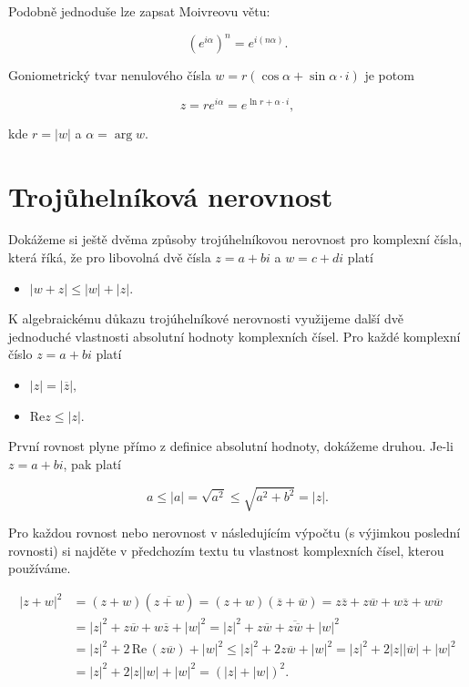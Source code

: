 \documentclass[12pt,a4paper]{report}
\begin{document}
	Podobně jednoduše lze zapsat Moivreovu větu:
	
	\begin{equation}
		(e^{i\alpha})^n = e^{i(n\alpha)}.
	\end{equation}
	
	Goniometrický tvar nenulového čísla $w = r(\cos\alpha + \sin\alpha\cdot i)$ je potom
	
	\begin{equation}
		z = re^{i\alpha} = e^{\ln r + \alpha\cdot i},
	\end{equation}
	
	kde $r = |w|$ a $\alpha = \arg w.$
	
	
	\section{Trojůhelníková nerovnost}
	
	Dokážeme si ještě dvěma způsoby trojúhelníkovou nerovnost pro komplexní čísla, která říká, že pro libovolná dvě čísla $z = a+bi$ a $w = c+di$ platí
	
	\begin{itemize}
		\item $|w+z| \le |w| + |z|.$
	\end{itemize}
	
	K algebraickému důkazu trojúhelníkové nerovnosti využijeme další dvě jednoduché vlastnosti absolutní hodnoty komplexních čísel. Pro každé komplexní číslo $z = a+bi$ platí
	
	\begin{itemize}
		\item $|z| = |\overline{z}|,$
		\item $\text{Re}z \le |z|.$
	\end{itemize}
	
	První rovnost plyne přímo z definice absolutní hodnoty, dokážeme druhou. Je-li $z =a+bi$, pak platí
	
	\begin{equation}
		a\le |a| = \sqrt{a^2} \le \sqrt{a^2 + b^2} = |z|.
	\end{equation}
	
	
	Pro každou rovnost nebo nerovnost v následujícím výpočtu (s výjimkou poslední rovnosti) si najděte v předchozím textu tu vlastnost komplexních čísel, kterou používáme.
	
	
	\begin{align}
		|z + w|^2 &= (z + w)(\overline{z + w}) = (z + w)(\overline{z} + \overline{w}) = z\overline{z} + z\overline{w} + w\overline{z} + w\overline{w}\\
		&= |z|^2 + z\overline{w} + w\overline{z} + |w|^2 = |z|^2 + z\overline{w} + \overline{z\overline{w}} + |w|^2\\
		&= |z|^2 + 2\,\text{Re}\,(z\overline{w}) + |w|^2 \le |z|^2 + 2z\overline{w} + |w|^2 = |z|^2 + 2|z||\overline{w}| + |w|^2\\
		&= |z|^2 + 2|z||w| + |w|^2 = (|z| + |w|)^2.
	\end{align}
	
\end{document}
